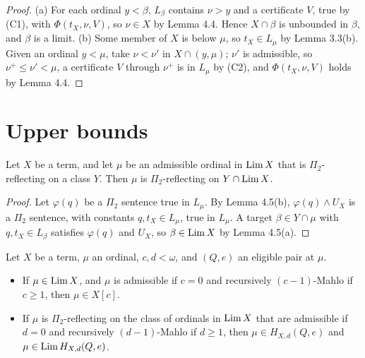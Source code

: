 \documentclass[11pt]{article}
\begin{document}
\begin{proof}
(a) For each ordinal $y < \beta$, $L_\beta$ contains $\nu > y$ and a certificate $V$, true by (C1), with $\Phi(t_X, \nu,
V)$, so $\nu \in X$ by Lemma 4.4. Hence $X \cap \beta$ is unbounded in $\beta$, and $\beta$ is a limit.
(b) Some member of $X$ is below $\mu$, so $t_X \in L_\mu$ by Lemma 3.3(b). Given an ordinal $y < \mu$, take $\nu <
\nu'$ in $X \cap (y, \mu)$; $\nu'$ is admissible, so $\nu^+ \le \nu' < \mu$, a certificate $V$ through $\nu^+$ is in
$L_\mu$ by (C2), and $\Phi(t_X, \nu, V)$ holds by Lemma 4.4.
\end{proof}

\section{Upper bounds}

\begin{statement} Let $X$ be a term, and let $\mu$ be an admissible ordinal in $\mathrm{Lim}\, X$ that is
$\Pi_2$-reflecting on a class $Y$. Then $\mu$ is $\Pi_2$-reflecting on $Y \cap \mathrm{Lim}\, X$.
\end{statement}

\begin{proof}
Let $\varphi(q)$ be a $\Pi_2$ sentence true in $L_\mu$. By Lemma 4.5(b), $\varphi(q) \wedge U_X$ is a $\Pi_2$
sentence, with constants $q, t_X \in L_\mu$, true in $L_\mu$. A target $\beta \in Y \cap \mu$ with $q, t_X \in L_\beta$
satisfies $\varphi(q)$ and $U_X$, so $\beta \in \mathrm{Lim}\, X$ by Lemma 4.5(a).
\end{proof}

\begin{statement} Let $X$ be a term, $\mu$ an ordinal, $c, d < \omega$, and $(Q, e)$ an eligible pair
at $\mu$.
\begin{itemize}
\item[(A)] If $\mu \in \mathrm{Lim}\, X$, and $\mu$ is admissible if $c = 0$ and recursively $(c-1)$-Mahlo if $c \ge 1$, then
  $\mu \in X[c]$.
\item[(B)] If $\mu$ is $\Pi_2$-reflecting on the class of ordinals in $\mathrm{Lim}\, X$ that are admissible if $d = 0$ and
  recursively $(d-1)$-Mahlo if $d \ge 1$, then $\mu \in H_{X,d}(Q, e)$ and $\mu \in \mathrm{Lim}\,
  H_{X,d}(Q, e)$.
\end{itemize}
\end{statement}
\end{document}
